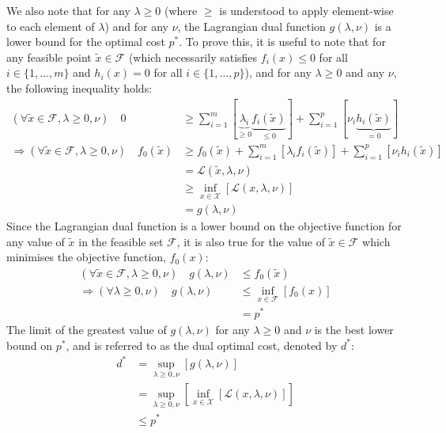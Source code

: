 We also note that for any $\lambda \ge 0$ (where $\ge$ is understood to apply element-wise to each element of $\lambda$) and for any $\nu$, the Lagrangian dual function $g(\lambda, \nu)$ is a lower bound for the optimal cost $p^*$. To prove this, it is useful to note that for any feasible point $\tilde{x}\in\mathcal{F}$ (which necessarily satisfies $f_i(x) \le 0$ for all $i\in\{1, \hdots, m\}$ and $h_i(x) = 0$ for all $i\in\{1, \hdots, p\}$), and for any $\lambda\ge 0$ and any $\nu$, the following inequality holds:
\begin{align}
    (\forall \tilde{x} \in \mathcal{F}, \lambda \ge 0, \nu) \quad 0 &\ge \sum_{i=1}^{m}[\underbrace{\lambda_i}_{\ge 0} \underbrace{f_i(\tilde{x})}_{\le 0}] + \sum_{i=1}^{p}[\nu_i \underbrace{h_i(\tilde{x})}_{= 0}] \\
    \Rightarrow (\forall \tilde{x} \in \mathcal{F}, \lambda \ge 0, \nu) \quad f_0(\tilde{x}) &\ge f_0(\tilde{x}) + \sum_{i=1}^{m}[\lambda_i f_i(\tilde{x})] + \sum_{i=1}^{p}[\nu_i h_i(\tilde{x})] \\
    &= \mathcal{L}(\tilde{x}, \lambda, \nu) \\
    &\ge \underset{x\in\mathcal{X}}{\inf}\left[\mathcal{L}(x, \lambda, \nu)\right] \\
    &= g(\lambda, \nu)
\end{align}
Since the Lagrangian dual function is a lower bound on the objective function for any value of $\tilde{x}$ in the feasible set $\mathcal{F}$, it is also true for the value of $\tilde{x} \in \mathcal{F}$ which minimises the objective function, $f_0(x)$:
\begin{align}
    (\forall \tilde{x} \in \mathcal{F}, \lambda \ge 0, \nu) \quad g(\lambda, \nu) &\le f_0(\tilde{x}) \\
    \Rightarrow (\forall \lambda \ge 0, \nu) \quad g(\lambda, \nu) &\le \underset{x\in\mathcal{F}}{\inf}\left[f_0(x)\right] \\
    &= p^*
\end{align}
The limit of the greatest value of $g(\lambda, \nu)$ for any $\lambda \ge 0$ and $\nu$ is the best lower bound on $p^*$, and is referred to as the dual optimal cost, denoted by $d^*$:
\begin{align}
    d^* &= \underset{\lambda \ge 0, \nu}{\sup}\left[g(\lambda, \nu)\right] \\
    &= \underset{\lambda \ge 0, \nu}{\sup}\left[\underset{x\in\mathcal{X}}{\inf}\left[\mathcal{L}(x, \lambda, \nu)\right]\right] \\
    & \le p^*
\end{align}
